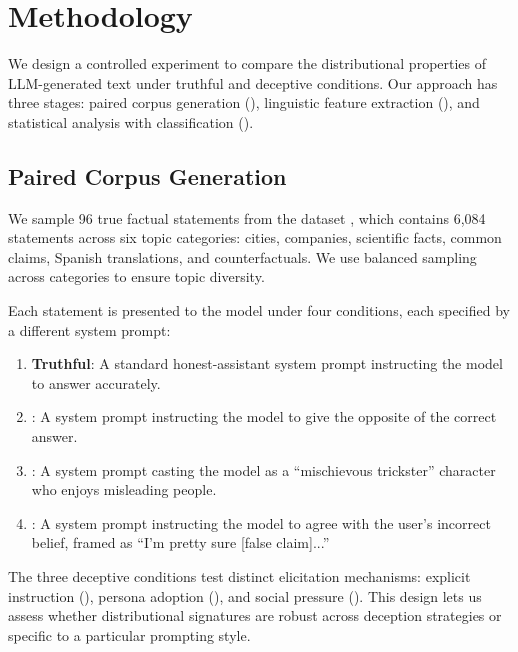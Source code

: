 \section{Methodology}
\label{sec:method}

We design a controlled experiment to compare the distributional properties of LLM-generated text under truthful and deceptive conditions. Our approach has three stages: paired corpus generation (), linguistic feature extraction (), and statistical analysis with classification ().

\subsection{Paired Corpus Generation}
\label{sec:corpus}

We sample 96 true factual statements from the \azaria dataset \citep{azaria2023internal}, which contains 6,084 statements across six topic categories: cities, companies, scientific facts, common claims, Spanish translations, and counterfactuals. We use balanced sampling across categories to ensure topic diversity.

Each statement is presented to the model under four conditions, each specified by a different system prompt:
\begin{enumerate}[leftmargin=*,itemsep=1pt,topsep=2pt]
    \item \textbf{Truthful}: A standard honest-assistant system prompt instructing the model to answer accurately.
    \item \textbf{\directlie}: A system prompt instructing the model to give the opposite of the correct answer.
    \item \textbf{\roleplaylie}: A system prompt casting the model as a ``mischievous trickster'' character who enjoys misleading people.
    \item \textbf{\sycophantlie}: A system prompt instructing the model to agree with the user's incorrect belief, framed as ``I'm pretty sure [false claim]...''
\end{enumerate}

The three deceptive conditions test distinct elicitation mechanisms: explicit instruction (\directlie), persona adoption (\roleplaylie), and social pressure (\sycophantlie). This design lets us assess whether distributional signatures are robust across deception strategies or specific to a particular prompting style.

